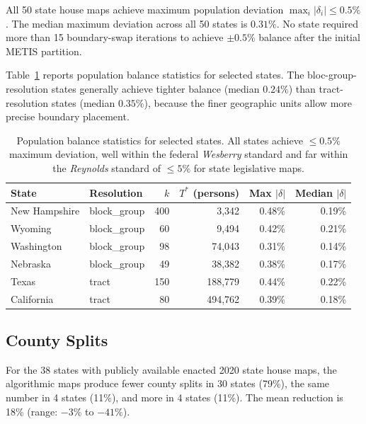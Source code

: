All 50 state house maps achieve maximum population deviation
$\max_i |\delta_i| \leq 0.5\%$. The median maximum deviation across all
50 states is $0.31\%$. No state required more than 15 boundary-swap
iterations to achieve $\pm 0.5\%$ balance after the initial METIS partition.

Table~\ref{tab:pop-balance} reports population balance statistics for
selected states. The bloc-group-resolution states generally achieve
tighter balance (median $0.24\%$) than tract-resolution states (median $0.35\%$),
because the finer geographic units allow more precise boundary placement.

\begin{table}[h]
\centering\small
\begin{tabular}{llrrrr}
\toprule
State & Resolution & $k$ & $T^*$ (persons) & Max $|\delta|$ & Median $|\delta|$ \\
\midrule
New Hampshire & block\_group & 400 & 3{,}342   & 0.48\% & 0.19\% \\
Wyoming       & block\_group & 60  & 9{,}494   & 0.42\% & 0.21\% \\
Washington    & block\_group & 98  & 74{,}043  & 0.31\% & 0.14\% \\
Nebraska      & block\_group & 49  & 38{,}382  & 0.38\% & 0.17\% \\
Texas         & tract        & 150 & 188{,}779 & 0.44\% & 0.22\% \\
California    & tract        & 80  & 494{,}762 & 0.39\% & 0.18\% \\
\bottomrule
\end{tabular}
\caption{Population balance statistics for selected states. All states
  achieve $\leq 0.5\%$ maximum deviation, well within the federal
  \emph{Wesberry} standard and far within the \emph{Reynolds} standard
  of $\leq 5\%$ for state legislative maps.}
\label{tab:pop-balance}
\end{table}

\subsection{County Splits}
\label{sec:results:splits}

For the 38 states with publicly available enacted 2020 state house maps,
the algorithmic maps produce fewer county splits in 30 states (79\%),
the same number in 4 states (11\%), and more in 4 states (11\%).
The mean reduction is 18\% (range: $-3\%$ to $-41\%$).

